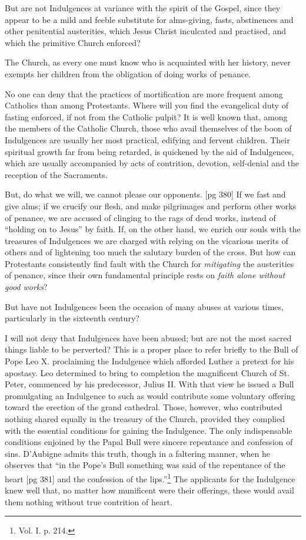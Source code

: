 But are not Indulgences at variance with the
spirit of the Gospel, since they appear to be a mild
and feeble substitute for alms-giving, fasts,
abstinences and other penitential austerities,
which Jesus Christ inculcated and practised, and
which the primitive Church enforced?

The Church, as every one must know who is acquainted
with her history, never exempts her children
from the obligation of doing works of penance.

No one can deny that the practices of mortification
are more frequent among Catholics than
among Protestants. Where will you find the
evangelical duty of fasting enforced, if not from
the Catholic pulpit? It is well known that, among
the members of the Catholic Church, those who
avail themselves of the boon of Indulgences are
usually her most practical, edifying and fervent
children. Their spiritual growth far from being
retarded, is quickened by the aid of Indulgences,
which are usually accompanied by acts of contrition,
devotion, self-denial and the reception of the
Sacraments.

But, do what we will, we cannot please our opponents.
[pg 380]
If we fast and give alms; if we crucify
our flesh, and make pilgrimages and perform other
works of penance, we are accused of clinging to the
rags of dead works, instead of ``holding on to
Jesus'' by faith. If, on the other hand, we enrich
our souls with the treasures of Indulgences we are
charged with relying on the vicarious merits of
others and of lightening too much the salutary
burden of the cross. But how can Protestants
consistently find fault with the Church for \emph{mitigating}
the austerities of penance, since their own
fundamental principle rests on \emph{faith alone without
good works}?

But have not Indulgences been the occasion of
many abuses at various times, particularly in the
sixteenth century?

I will not deny that Indulgences have been
abused; but are not the most sacred things liable
to be perverted? This is a proper place to refer
briefly to the Bull of Pope Leo X. proclaiming the
Indulgence which afforded Luther a pretext for
his apostasy. Leo determined to bring to completion
the magnificent Church of St. Peter, commenced
by his predecessor, Julius II. With that
view he issued a Bull promulgating an Indulgence
to such as would contribute some voluntary offering
toward the erection of the grand cathedral.
Those, however, who contributed nothing shared
equally in the treasury of the Church, provided
they complied with the essential conditions for
gaining the Indulgence. The only indispensable
conditions enjoined by the Papal Bull were sincere
repentance and confession of sins. D'Aubigne
admits this truth, though in a faltering manner,
when he observes that “in the Pope's Bull
something was said of the repentance of the heart
[pg 381]
and the confession of the lips.”\footnote{Vol.
I. p. 214.} The applicants
for the Indulgence knew well that, no matter how
munificent were their offerings, these would avail
them nothing without true contrition of heart.

